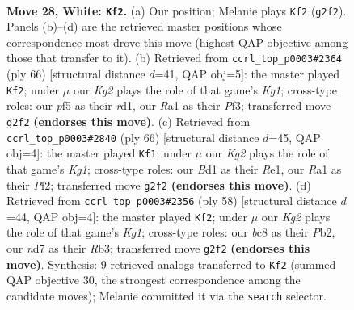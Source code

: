 \documentclass[11pt]{article}
\begin{document}
\clearpage

\begin{figure}[p]\centering
\begin{subfigure}{0.46\textwidth}\centering
\resizebox{\linewidth}{!}{%
\newchessgame
\chessboard[
  setfen={r1b4k/3n4/1p4p1/2p2p2/2P2P2/p1P3P1/P2B2K1/R2B4 w - - 5 28},
  showmover=false,
  pgfstyle=straightmove, color=movearrow, markmove={g2-f2}
]}
\caption{}
\end{subfigure}\hfill
\begin{subfigure}{0.46\textwidth}\centering
\resizebox{\linewidth}{!}{%
\newchessgame
\chessboard[
  setfen={8/1pp3pk/4n2p/P3Pp2/P7/R1B2P1P/6P1/3r2K1 w - - 0 34},
  showmover=false,
  pgfstyle=straightmove, color=movearrow, markmove={g1-f2}
]}
\caption{}
\end{subfigure}
\\[4pt]
\begin{subfigure}{0.46\textwidth}\centering
\resizebox{\linewidth}{!}{%
\newchessgame
\chessboard[
  setfen={6k1/5pp1/pnrPp2p/1p2P2P/1B6/P7/5PP1/4R1K1 w - - 0 34},
  showmover=false,
  pgfstyle=straightmove, color=movearrow, markmove={g1-f1}
]}
\caption{}
\end{subfigure}\hfill
\begin{subfigure}{0.46\textwidth}\centering
\resizebox{\linewidth}{!}{%
\newchessgame
\chessboard[
  setfen={r1b1k3/7p/2p3p1/p2n1pB1/2B5/PR3PP1/1P5P/6K1 w - - 2 30},
  showmover=false,
  pgfstyle=straightmove, color=movearrow, markmove={g1-f2}
]}
\caption{}
\end{subfigure}
\caption{\textbf{Move 28, White: \texttt{Kf2}.} (a) Our position; Melanie plays \texttt{Kf2} (\texttt{g2f2}). Panels (b)--(d) are the retrieved master positions whose correspondence most drove this move (highest QAP objective among those that transfer to it). (b) Retrieved from \texttt{ccrl\_top\_p0003\#2364} (ply 66) [structural distance $d$=41, QAP obj=5]: the master played \texttt{Kf2}; under $\mu$ our \emph{Kg2} plays the role of that game's \emph{Kg1}; cross-type roles: our \emph{p}f5 as their \emph{r}d1, our \emph{R}a1 as their \emph{P}f3; transferred move \texttt{g2f2} \textbf{(endorses this move)}. (c) Retrieved from \texttt{ccrl\_top\_p0003\#2840} (ply 66) [structural distance $d$=45, QAP obj=4]: the master played \texttt{Kf1}; under $\mu$ our \emph{Kg2} plays the role of that game's \emph{Kg1}; cross-type roles: our \emph{B}d1 as their \emph{R}e1, our \emph{R}a1 as their \emph{P}f2; transferred move \texttt{g2f2} \textbf{(endorses this move)}. (d) Retrieved from \texttt{ccrl\_top\_p0003\#2356} (ply 58) [structural distance $d$=44, QAP obj=4]: the master played \texttt{Kf2}; under $\mu$ our \emph{Kg2} plays the role of that game's \emph{Kg1}; cross-type roles: our \emph{b}c8 as their \emph{P}b2, our \emph{n}d7 as their \emph{R}b3; transferred move \texttt{g2f2} \textbf{(endorses this move)}. Synthesis: 9 retrieved analogs transferred to \texttt{Kf2} (summed QAP objective 30, the strongest correspondence among the candidate moves); Melanie committed it via the \texttt{search} selector.}
\label{fig:thought-m54}
\end{figure}
\end{document}
